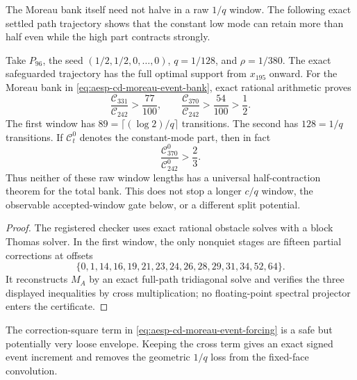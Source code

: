 The Moreau bank itself need not halve in a raw $1/q$ window.  The following
exact settled path trajectory shows that the constant low mode can retain
more than half even while the high part contracts strongly.

\begin{proposition}
\label{prop:aesp-cd-p96-full-face-window-stop}
Take $P_{96}$, the seed $(1/2,1/2,0,\ldots,0)$, $q=1/128$, and
$\rho=1/380$.  The exact safeguarded trajectory has the full optimal support
from $x_{195}$ onward.  For the Moreau bank in
\cref{eq:aesp-cd-moreau-event-bank}, exact rational arithmetic proves
\begin{equation}
 \frac{\mathcal C_{331}}{\mathcal C_{242}}>\frac{77}{100},
 \qquad
 \frac{\mathcal C_{370}}{\mathcal C_{242}}>\frac{54}{100}>\frac12.
 \label{eq:aesp-cd-p96-full-face-window-stop}
\end{equation}
The first window has $89=\lceil(\log 2)/q\rceil$ transitions.  The second has
$128=1/q$ transitions.  If $\mathcal C_t^0$ denotes the constant-mode part,
then in fact
\begin{equation*}
 \frac{\mathcal C_{370}^0}{\mathcal C_{242}^0}>\frac23.
\end{equation*}
Thus neither of these raw window lengths has a universal half-contraction
theorem for the total bank.  This does not stop a longer $c/q$ window, the
observable accepted-window gate below, or a different split potential.
\end{proposition}

\begin{proof}
The registered checker uses exact rational obstacle solves with a block
Thomas solver.  In the first window, the only nonquiet stages are fifteen
partial corrections at offsets
\begin{equation*}
 \{0,1,14,16,19,21,23,24,26,28,29,31,34,52,64\}.
\end{equation*}
It reconstructs $M_A$ by an exact full-path tridiagonal solve and verifies
the three displayed inequalities by cross multiplication; no floating-point
spectral projector enters the certificate.
\end{proof}

The correction-square term in \cref{eq:aesp-cd-moreau-event-forcing} is a
safe but potentially very loose envelope.  Keeping the cross term gives an
exact signed event increment and removes the geometric $1/q$ loss from the
fixed-face convolution.

